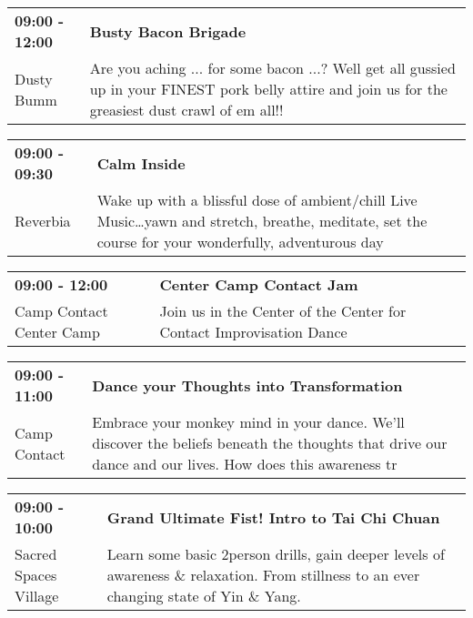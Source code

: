 \begin{tabular}{ p{1in} p{2.2in} }
    \textbf{09:00 - 12:00} & \textbf{Busty Bacon Brigade} \\
    Dusty Bumm \newline  & Are you aching ... for some bacon ...? Well get all gussied up in your FINEST pork belly attire and join us for the greasiest dust crawl of em all!! \\
    \hline 
\end{tabular}
    
\begin{tabular}{ p{1in} p{2.2in} }
    \textbf{09:00 - 09:30} & \textbf{Calm Inside} \\
    Reverbia \newline  & Wake up with a blissful dose of ambient/chill Live Music\ldots yawn and stretch, breathe, meditate, set the course for your wonderfully, adventurous day \\
    \hline 
\end{tabular}
    
\begin{tabular}{ p{1in} p{2.2in} }
    \textbf{09:00 - 12:00} & \textbf{Center Camp Contact Jam} \\
    Camp Contact \newline Center Camp & Join us in the Center of the Center for Contact Improvisation Dance \\
    \hline 
\end{tabular}
    
\begin{tabular}{ p{1in} p{2.2in} }
    \textbf{09:00 - 11:00} & \textbf{Dance your Thoughts into Transformation} \\
    Camp Contact \newline  & Embrace your monkey mind in your dance. We'll discover the beliefs beneath the thoughts that drive our dance and our lives. How does this awareness tr \\
    \hline 
\end{tabular}
    
\begin{tabular}{ p{1in} p{2.2in} }
    \textbf{09:00 - 10:00} & \textbf{Grand Ultimate Fist! Intro to Tai Chi Chuan} \\
    Sacred Spaces Village \newline  & Learn some basic 2person drills, gain deeper levels of awareness \& relaxation. From stillness to an ever changing state of Yin \& Yang. \\
    \hline 
\end{tabular}
    
